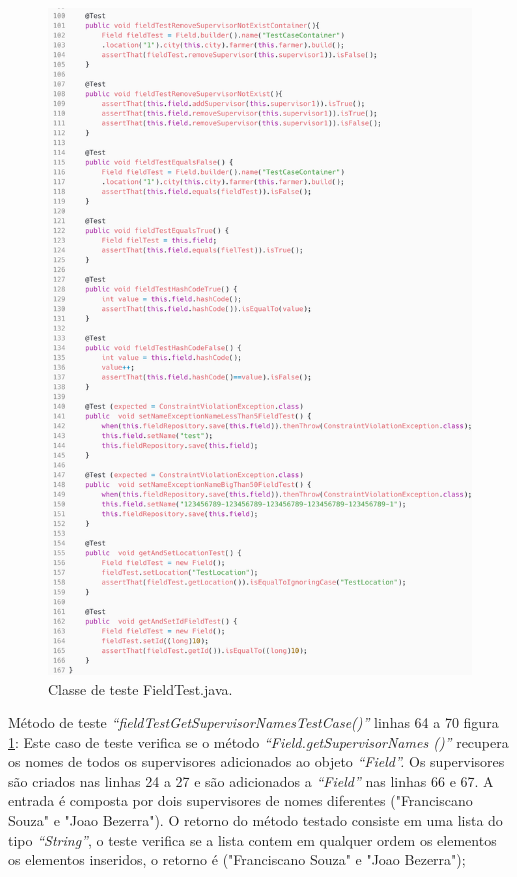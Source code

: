 \begin{figure}[H]
	\centering
	\includegraphics[scale=0.17]{dados/figuras/carbonField2.png}
	\caption{Classe de teste FieldTest.java.}
	\label{field1}
\end{figure}






Método de teste\textit{ “fieldTestGetSupervisorNamesTestCase()”} linhas 64 a 70 figura \ref{field1}: Este caso de teste verifica se o método\textit{ “Field.getSupervisorNames ()”} recupera os nomes de todos os supervisores adicionados ao objeto \textit{“Field”.} Os supervisores são criados nas linhas 24 a 27 e são adicionados a\textit{ “Field”} nas linhas 66 e 67. A entrada é composta por dois supervisores de nomes diferentes ("Franciscano Souza" e "Joao Bezerra"). O retorno do método testado consiste em uma lista do tipo \textit{“String”}, o teste verifica se a lista contem em qualquer ordem os elementos os elementos inseridos, o retorno é ("Franciscano Souza" e "Joao Bezerra");

